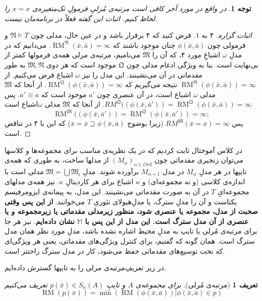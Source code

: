 \documentclass[12pt,a4paper]{report}
\theoremstyle{colorhead}
\newtheorem{defn}[thm]{تعریف}
\newtheorem{tav}[thm]{توجه}
\DeclareMathOperator{\RM}{RM}
\begin{document}
\begin{tav}
	در واقع در مورد آخر کافی  است مرتبه‌ی مُرلیِ
فرمولِ
تک‌متغیره‌ی
$x=x$
را لحاظ کنیم. اثبات این گفته فعلاً در برنامه‌مان نیست.
	\end{tav}
	\begin{proof}[اثبات گزاره]
	۴ به ۱. فرض کنید که ۴ برقرار باشد و در عین حال، مدلی چون
	$\mathfrak{N}\models T$
	و فرمولی چون
	$\phi(\bar{x},\bar{a})$
	چنان موجود باشند که 
	$\RM^\mathfrak{N}(\bar{x},\bar{a})=\infty$.
	می‌دانیم که در مدلِ
	$\omega$
	اشباعِ مورد ۴، که آن را
	$\mathfrak{M}$
	می‌نامیم، 
	 مرتبه‌‌ی مرلی همه‌ی فرمولها کمتر از بی‌نهایت است. بنا به ویژگی ادغام مدلی چون
	$\mathfrak{Q}$
	موجود است که هر دوی
	$\mathfrak{M},\mathfrak{N}$
	به طور مقدماتی در آن می‌نشینند. این مدل را نیز
	$\omega$
	اشباع فرض می‌کنیم. از
	$\RM^\mathfrak{N}(\phi(\bar{x},\bar{a}))=\infty$
	نتیجه می‌گیریم که 
	$\RM^\mathfrak{Q}(\phi(\bar{x},\bar{a}))=\infty$.
	از آنجا که
	$\mathfrak{M}$
	مدلی
	$\omega$
	اشباع است، در آن عنصری چون
	$a'$
	موجود است که 
	$a'\equiv a$.
	پس
	\mbox{$RM^\mathfrak{Q}((\phi(\bar{x},\bar{a}'))=\RM^\mathfrak{Q}(\phi(\bar{x},\bar{a}))=\infty$.}
	از آنجا که 
	$\mathfrak{M}$
	مدلی
	$\omega$اشباع 
	است
	\[
	\RM^\mathfrak{M}((\phi(\bar{x},\bar{a}'))=
	\RM^\mathfrak{Q}(\phi(\bar{x},\bar{a}'))=\infty;
	\]
	پس
	$RM^\mathfrak{M}(\bar{x}=\bar{x})=\infty$
	(زیرا بوضوح
	$\bar{x}=\bar{x}\supseteq \phi(\bar{x},\bar{a})$)
	که این با ۴ در تناقض است.	
	\end{proof}
در کلاس آموختال ثابت کردیم که 
در یک نظریه‌ی مناسب برای مجموعه‌ها و کلاسها
می‌توان زنجیری مقدماتی چون
$(M_\alpha)_{\alpha\in Ord}$
از مدلها ساخت، به طوری که همه‌ی تایپها در هر مدلِ
$M_\alpha$
در مدل
$M_{\alpha+1}$
برآورده شوند. مدلِ
$\mathfrak{M}=\bigcup\mathfrak{M}_i$
مدلی است با اندازه‌ی کلاسی (و نه مجموعه‌ای) و 
$\kappa$
اشباع برای هر کاردینالِ
$\kappa$.
نیز همه‌‌ی مدلهای مجموعه‌ایِ
$T$
در آن به صورت مقدماتی می‌نشینند. این مدل، به پیمانه‌ی ایزومرفیسم یکتاست و آن را مدلِ
سترگ، یا مدلِ‌هیولای تئوریِ
$T$
می‌خوانند. \textbf{از این پس وقتی صحبت از مدل، مجموعه یا عنصری شود، منظور زیرمدلی مقدماتی یا زیرمجموعه و یا عنصری از آن مدل سترگ است. این مدل از این پس با
$\mathbb{M}$
نشان داده‌ایم}.
نیز هر جا برای مرتبه‌ی مُرلی یا تایپ به مدلِ
محیط
 اشاره نشده باشد، مدلِ مورد نظر همان مدل سترگ است.
 همان گونه که گفتیم، 
برای کنترل
ویژگی‌های مقدماتی، یعنی هر ویژگی‌ای که تحت توسیع‌های مقدماتی حفظ می‌شود، کار در مدل سترگ راحتتر است. 
\par 
در زیر تعریفِ‌مرتبه‌ی مرلی را به تایپها گسترش داده‌ایم. 
\begin{defn}[مرتبه‌ی مُرلی]
برای مجموعه‌ی 
$A$
و تایپِ
$p(\bar{x})\in S_n(A)$
تعریف می‌کنیم
\[
\RM(p(\bar{x}))=\min (\RM(\phi(\bar{x},\bar{a}))|\phi(\bar{x},\bar{a})\in p)
\]
\end{defn}
\end{document}
